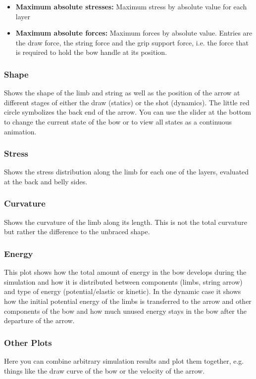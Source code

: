 \documentclass[12pt]{article}
\begin{document}
\begin{itemize}
\item \textbf{Maximum absolute stresses:} Maximum stress by absolute value for each layer
\item \textbf{Maximum absolute forces:} Maximum forces by absolute value. Entries are the draw force, the string force and the grip support force, i.e. the force that is required to hold the bow handle at its position.
\end{itemize}

\subsubsection{Shape} Shows the shape of the limb and string as well as the position of the arrow at different stages of either the draw (statics) or the shot (dynamics).
The little red circle symbolizes the back end of the arrow.
You can use the slider at the bottom to change the current state of the bow or to view all states as a continuous animation.

\subsubsection{Stress} Shows the stress distribution along the limb for each one of the layers, evaluated at the back and belly sides.

\subsubsection{Curvature} Shows the curvature of the limb along its length.
This is not the total curvature but rather the difference to the unbraced shape.

\subsubsection{Energy} This plot shows how the total amount of energy in the bow develops during the simulation and how it is distributed between components (limbs, string arrow) and type of energy (potential/elastic or kinetic).
In the dynamic case it shows how the initial potential energy of the limbs is transferred to the arrow and other components of the bow and how much unused energy stays in the bow after the departure of the arrow.

\subsubsection{Other Plots} Here you can combine arbitrary simulation results and plot them together, e.g. things like the draw curve of the bow or the velocity of the arrow.
\end{document}
